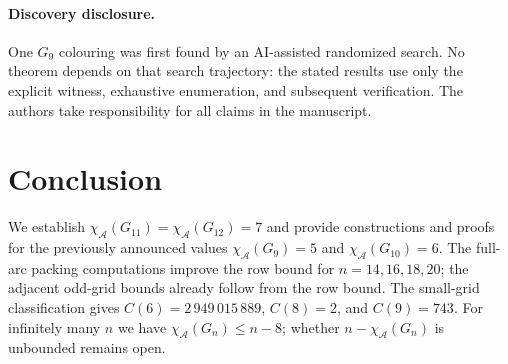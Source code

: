\documentclass[11pt]{article}
\theoremstyle{definition}
\theoremstyle{remark}
\renewcommand{\le}{\leqslant}
\begin{document}
\paragraph{Discovery disclosure.}
One \(G_9\) colouring was first found by an AI-assisted randomized search.
No theorem depends on that search trajectory: the stated results use only
the explicit witness, exhaustive enumeration, and subsequent verification.
The authors take responsibility for all claims in the manuscript.

\section{Conclusion}

We establish \(\chi_{\mathcal A}(G_{11})=\chi_{\mathcal A}(G_{12})=7\)
and provide constructions and proofs for the previously announced values
\(\chi_{\mathcal A}(G_9)=5\) and \(\chi_{\mathcal A}(G_{10})=6\).
The full-arc packing computations improve the row bound for
\(n=14,16,18,20\); the adjacent odd-grid bounds already follow from the
row bound.  The small-grid classification gives
\(C(6)=2\,949\,015\,889\), \(C(8)=2\), and \(C(9)=743\).
For infinitely many \(n\) we have \(\chi_{\mathcal A}(G_n)\le n-8\);
whether \(n-\chi_{\mathcal A}(G_n)\) is unbounded remains open.
\end{document}
